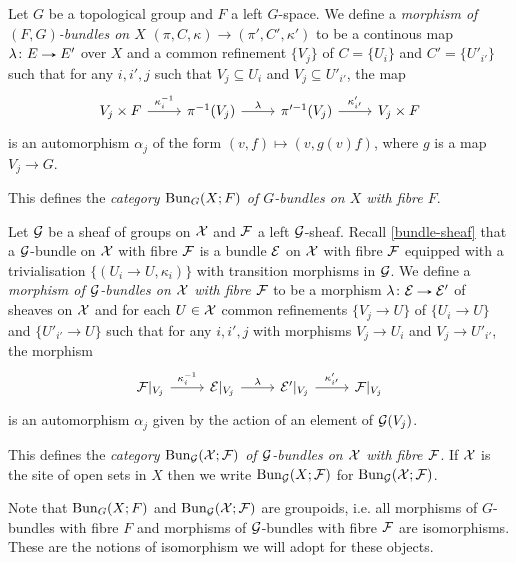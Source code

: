 \begin{definitions}
  \label{fibre-bundle-cat}
  Let $G$ be a topological group and $F$ a left $G$-space. We define a
  \emph{morphism of $(F,G)$-bundles on $X$} $(\pi,C,\kappa) \to
  (\pi',C',\kappa')$ to be a continous map $\lambda \c E \to E'$ over
  $X$ and a common refinement $\{V_j\}$ of $C = \{U_i\}$ and $C' =
  \{U'_{i'}\}$ such that for any $i,i',j$ such that $V_j \subseteq
  U_i$ and $V_j \subseteq U'_{i'}$, the map
  \[
  \begin{tikzcd}
    V_j \times F \ar{r}{\kappa_i^{-1}} &
    \pi^{-1}(V_j) \ar{r}{\lambda} &
    \pi'^{-1}(V_j) \ar{r}{\kappa'_{i'}} &
    V_j \times F
  \end{tikzcd}
  \]
  is an automorphism $\alpha_j$ of the form $(v,f) \mapsto (v,
  g(v)f)$, where $g$ is a map $V_j \to G$.

  This defines the \emph{category $\operatorname{Bun}_G(X;F)$ of $G$-bundles on $X$
    with fibre $F$}.
\end{definitions}
  
\begin{definitions}
  \label{bundle-sheaf-cat}
  Let $\mathcal{G}$ be a sheaf of groups on $\mathcal{X}$ and $\mathcal{F}$ a left
  $\mathcal{G}$-sheaf. Recall \cref{bundle-sheaf} that a $\mathcal{G}$-bundle on $\mathcal{X}$
  with fibre $\mathcal{F}$ is a bundle $\mathcal{E}$ on $\mathcal{X}$ with fibre $\mathcal{F}$ equipped
  with a trivialisation $\{(U_i \to U,\kappa_i)\}$ with transition
  morphisms in $\mathcal{G}$. We define a \emph{morphism of $\mathcal{G}$-bundles on
    $\mathcal{X}$ with fibre $\mathcal{F}$} to be a morphism $\lambda \c \E \to \E'$ of
  sheaves on $\mathcal{X}$ and for each $U \in \mathcal{X}$ common refinements $\{V_j
  \to U\}$ of $\{U_i \to U\}$ and $\{U'_{i'} \to U\}$ such that for
  any $i,i',j$ with morphisms $V_j \to U_i$ and $V_j \to U'_{i'}$, the
  morphism
  \[
  \begin{tikzcd}
    \F|_{V_j} \ar{r}{\kappa_i^{-1}} &
    \E|_{V_j} \ar{r}{\lambda} &
    \E'|_{V_j} \ar{r}{\kappa'_{i'}} &
    \F|_{V_j}
  \end{tikzcd}
  \]
  is an automorphism $\alpha_j$ given by the action of an element of
  $\mathcal{G}(V_j)$.

  This defines the \emph{category $\operatorname{Bun}_{\mathcal{G}}(\mathcal{X};\mathcal{F})$ of $\mathcal{G}$-bundles on
    $\mathcal{X}$ with fibre $\mathcal{F}$}. If $\mathcal{X}$ is the site of open sets in $X$
  then we write $\operatorname{Bun}_{\mathcal{G}}(X;\mathcal{F})$ for $\operatorname{Bun}_{\mathcal{G}}(\mathcal{X};\mathcal{F})$.
\end{definitions}

\begin{remark}
  Note that $\operatorname{Bun}_G(X;F)$ and $\operatorname{Bun}_{\mathcal{G}}(\mathcal{X};\mathcal{F})$ are groupoids, i.e. all
  morphisms of $G$-bundles with fibre $F$ and morphisms of
  $\mathcal{G}$-bundles with fibre $\mathcal{F}$ are isomorphisms. These are the notions
  of isomorphism we will adopt for these objects.
\end{remark}

